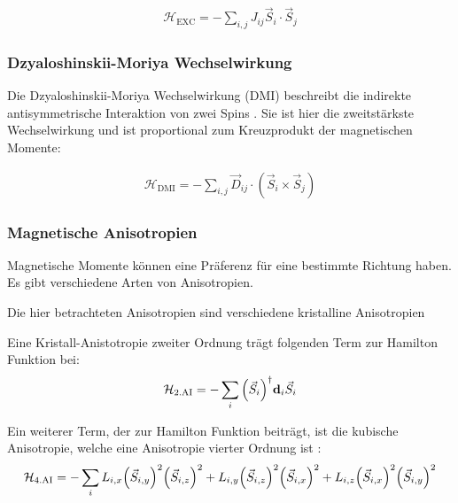 \documentclass[main.tex]{subfiles}
\begin{document}
\begin{align}
	\mathcal{H}_{\text{EXC}} = -\sum_{i,j} J_{ij} \vec{S}_i \cdot
	\vec{S}_j\label{eq:hamilton-heisenberg-exc}
\end{align}

\subsubsection*{Dzyaloshinskii-Moriya Wechselwirkung}

Die Dzyaloshinskii-Moriya Wechselwirkung (DMI) beschreibt die indirekte
antisymmetrische Interaktion von zwei Spins \cite{DMI}.
Sie ist hier die zweitstärkste Wechselwirkung und ist proportional zum
Kreuzprodukt der magnetischen Momente:

\begin{align}
	\mathcal{H}_{\text{DMI}} = -\sum_{i,j} \vec{D}_{ij} \cdot (\vec{S}_i
	\times
	\vec{S}_j)\label{eq:hamilton-dmi}
\end{align}


\subsubsection*{Magnetische Anisotropien}
Magnetische Momente können eine Präferenz für eine bestimmte Richtung haben.
Es gibt verschiedene Arten von Anisotropien.

Die hier betrachteten Anisotropien sind verschiedene kristalline Anisotropien


Eine Kristall-Anistotropie zweiter Ordnung trägt folgenden Term zur Hamilton
Funktion bei:
\begin{align}
	\mathcal{H}_{\text{2.AI}} = -\sum_{i} \qty(\vec{S}_i)^\dagger
	\bm{\mathrm{d}}_i
	\vec{S}_i\label{eq:hamilton-2a}
\end{align}


Ein weiterer Term, der zur Hamilton Funktion beiträgt, ist die kubische
Anisotropie, welche eine Anisotropie vierter Ordnung ist \cite{GrossMarx}:
\begin{align}
	\mathcal{H}_{\text{4.AI}} = -\sum_{i} L_{i,x} \qty(\vec{S}_{i,y})^2
	\qty(\vec{S}_{i,z})^2 + L_{i,y} \qty(\vec{S}_{i,z})^2
	\qty(\vec{S}_{i,x})^2
	+
	L_{i,z} \qty(\vec{S}_{i,x})^2
	\qty(\vec{S}_{i,y})^2\label{eq:hamilton-4a}
\end{align}
\end{document}
